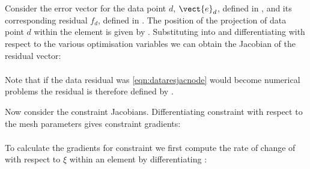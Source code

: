 Consider the error vector for the data point $d$, $\vect{e}_{d}$, defined in
, and its corresponding residual $f_{d}$, defined in
. The position of the projection of data point $d$
within the element is given by .  Substituting
 into  and
differentiating with respect to the various optimisation variables we can
obtain the Jacobian of the residual vector:
\begin{eqnarray}
\end{eqnarray}

Note that if the data residual was
\eqref{eqn:dataresjacnode} would become
numerical problems the residual is therefore defined by
.

Now consider the constraint Jacobians. Differentiating constraint
 with respect to the mesh parameters gives constraint
gradients:
\begin{eqnarray}
\end{eqnarray}

To calculate the gradients for constraint  we first
compute the rate of change of  with respect to $\xi$ within an element
by differentiating :
\begin{equation}
  \label{eqn:delxdelxiinterp}
\end{equation}

